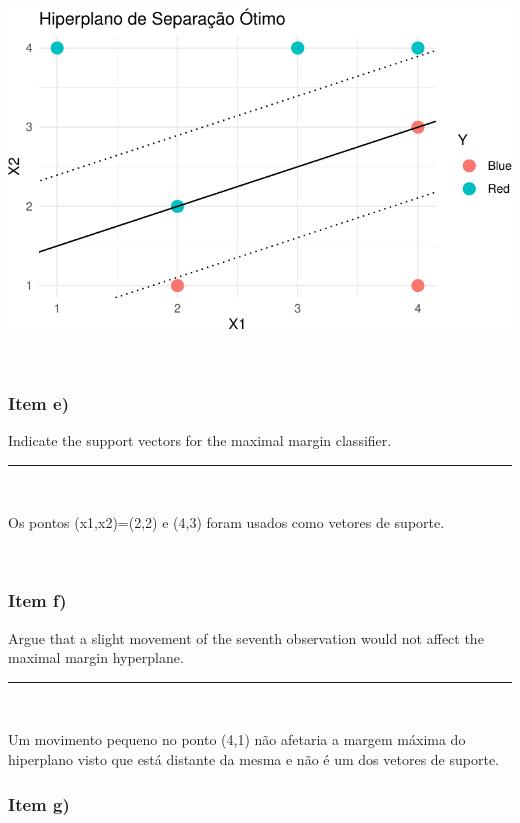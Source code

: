 \documentclass[
  a4paperpaper,
]{article}
\begin{document}
\includegraphics{lista-5_files/figure-pdf/unnamed-chunk-11-1.pdf}

~

\subsubsection{Item e)}\label{item-e}

Indicate the support vectors for the maximal margin classifier.

\begin{center}\rule{0.5\linewidth}{0.5pt}\end{center}

~

Os pontos (x1,x2)=(2,2) e (4,3) foram usados como vetores de suporte.

~

\subsubsection{Item f)}\label{item-f}

Argue that a slight movement of the seventh observation would not affect
the maximal margin hyperplane.

\begin{center}\rule{0.5\linewidth}{0.5pt}\end{center}

~

Um movimento pequeno no ponto (4,1) não afetaria a margem máxima do
hiperplano visto que está distante da mesma e não é um dos vetores de
suporte. ~

\subsubsection{Item g)}\label{item-g}
\end{document}
